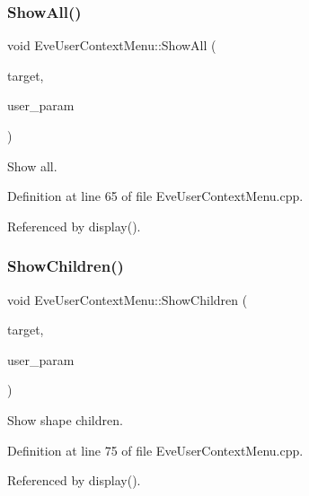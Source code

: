 \subsubsection{\texorpdfstring{Show\+All()}{ShowAll()}}
{\footnotesize\ttfamily void Eve\+User\+Context\+Menu\+::\+Show\+All (\begin{DoxyParamCaption}\item[{\hyperlink{class_t_object}{T\+Object} $\ast$}]{target,  }\item[{void $\ast$}]{user\+\_\+param }\end{DoxyParamCaption})}



Show all. 



Definition at line 65 of file Eve\+User\+Context\+Menu.\+cpp.



Referenced by display().

\hypertarget{class_d_d4hep_1_1_eve_user_context_menu_a246160e0e92283c590666845eea452e9}{}\label{class_d_d4hep_1_1_eve_user_context_menu_a246160e0e92283c590666845eea452e9} 
\subsubsection{\texorpdfstring{Show\+Children()}{ShowChildren()}}
{\footnotesize\ttfamily void Eve\+User\+Context\+Menu\+::\+Show\+Children (\begin{DoxyParamCaption}\item[{\hyperlink{class_t_object}{T\+Object} $\ast$}]{target,  }\item[{void $\ast$}]{user\+\_\+param }\end{DoxyParamCaption})}



Show shape children. 



Definition at line 75 of file Eve\+User\+Context\+Menu.\+cpp.



Referenced by display().

\hypertarget{class_d_d4hep_1_1_eve_user_context_menu_a38b76e87d1f304a24dc46692090c9c7f}{}\label{class_d_d4hep_1_1_eve_user_context_menu_a38b76e87d1f304a24dc46692090c9c7f} 

